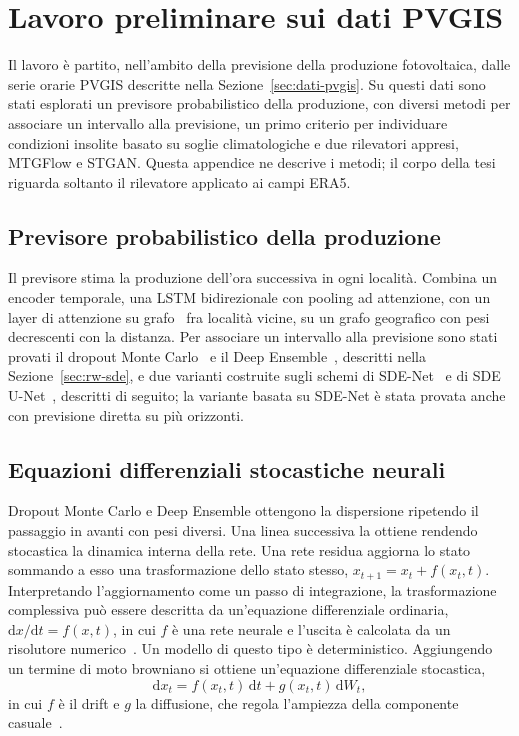 \chapter{Lavoro preliminare sui dati PVGIS}
\label{app:pvgis}

Il lavoro è partito, nell'ambito della previsione della produzione fotovoltaica, dalle serie orarie PVGIS descritte nella Sezione~\ref{sec:dati-pvgis}. Su questi dati sono stati esplorati un previsore probabilistico della produzione, con diversi metodi per associare un intervallo alla previsione, un primo criterio per individuare condizioni insolite basato su soglie climatologiche e due rilevatori appresi, MTGFlow e STGAN. Questa appendice ne descrive i metodi; il corpo della tesi riguarda soltanto il rilevatore applicato ai campi ERA5.

\section{Previsore probabilistico della produzione}
\label{app:pvgis-previsore}

Il previsore stima la produzione dell'ora successiva in ogni località. Combina un encoder temporale, una LSTM bidirezionale con pooling ad attenzione, con un layer di attenzione su grafo~\cite{velickovic2018gat} fra località vicine, su un grafo geografico con pesi decrescenti con la distanza. Per associare un intervallo alla previsione sono stati provati il dropout Monte Carlo~\cite{gal2016dropout} e il Deep Ensemble~\cite{lakshminarayanan2017ensembles}, descritti nella Sezione~\ref{sec:rw-sde}, e due varianti costruite sugli schemi di SDE-Net~\cite{kong2020sdenet} e di SDE U-Net~\cite{monaco2025sdeunet}, descritti di seguito; la variante basata su SDE-Net è stata provata anche con previsione diretta su più orizzonti.

\section{Equazioni differenziali stocastiche neurali}
\label{app:pvgis-sde}

Dropout Monte Carlo e Deep Ensemble ottengono la dispersione ripetendo il passaggio in avanti con pesi diversi. Una linea successiva la ottiene rendendo stocastica la dinamica interna della rete. Una rete residua aggiorna lo stato sommando a esso una trasformazione dello stato stesso, $x_{t+1}=x_t+f(x_t,t)$. Interpretando l'aggiornamento come un passo di integrazione, la trasformazione complessiva può essere descritta da un'equazione differenziale ordinaria, $\mathrm{d}x/\mathrm{d}t=f(x,t)$, in cui $f$ è una rete neurale e l'uscita è calcolata da un risolutore numerico~\cite{chen2018neuralode}. Un modello di questo tipo è deterministico. Aggiungendo un termine di moto browniano si ottiene un'equazione differenziale stocastica,
\begin{equation}
\mathrm{d}x_t=f(x_t,t)\,\mathrm{d}t+g(x_t,t)\,\mathrm{d}W_t,
\end{equation}
in cui $f$ è il drift e $g$ la diffusione, che regola l'ampiezza della componente casuale~\cite{kong2020sdenet}.

